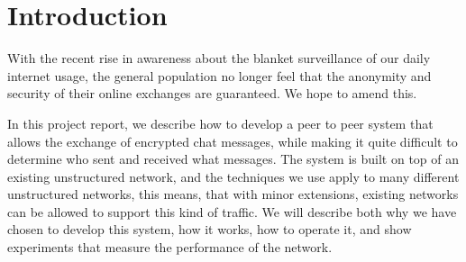 \section{Introduction}

With the recent rise in awareness about the blanket surveillance of our daily internet usage, the general population no longer feel that the anonymity and security of their online exchanges are guaranteed. We hope to amend this. 

In this project report, we describe how to develop a peer to peer system that allows the exchange of  encrypted chat messages, while making it quite difficult to determine who sent and received what messages.
The system is built on top of an existing unstructured network, and the techniques we use apply to many different unstructured networks, this means, that with minor extensions, existing networks can be allowed to support this kind of traffic.
We will describe both why we have chosen to develop this system, how it works, how to operate it, and show experiments that measure the performance of the network.
